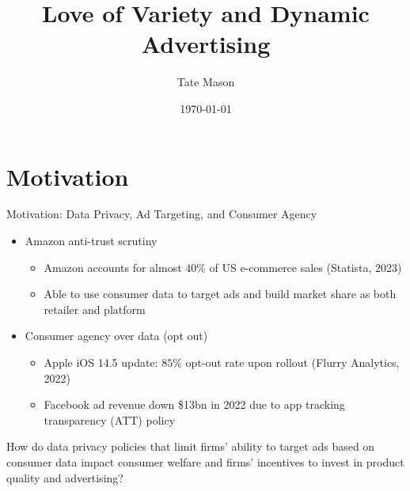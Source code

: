 \documentclass[aspectratio=169,professionalfonts]{beamer}
\title[Love of Variety \& Dynamic Advertising]{%
    Love of Variety and Dynamic Advertising}
\subtitle{}
\author[T. Mason]{Tate Mason}
\institute[UGA]{John Munro Godfrey Sr.\ Dept.\ of Economics \\ University of Georgia}
\date{\today}
\begin{document}
\begin{frame}[noframenumbering]
  \titlepage
\end{frame}

\section{Motivation}

\begin{frame}{Motivation: Data Privacy, Ad Targeting, and Consumer Agency}
  \begin{itemize}
    \item Amazon anti-trust scrutiny
    \begin{itemize}
      \item Amazon accounts for almost $40\%$ of US e-commerce sales (Statista, 2023)
      \item Able to use consumer data to target ads and build market share as both retailer and platform
    \end{itemize}
    \item Consumer agency over data (opt out)
    \begin{itemize}
      \item Apple iOS 14.5 update: $85\%$ opt-out rate upon rollout (Flurry Analytics, 2022)
      \item Facebook ad revenue down \$13bn in 2022 due to app tracking transparency (ATT) policy
    \end{itemize}
  \end{itemize}
  \begin{tcolorbox}[colback=red!5!white, colframe=UGARed, title=\textbf{Key Concern}]
    How do data privacy policies that limit firms' ability to target ads based on consumer data impact consumer welfare and firms' incentives to invest in product quality and advertising?
  \end{tcolorbox}
\end{frame}
\end{document}

